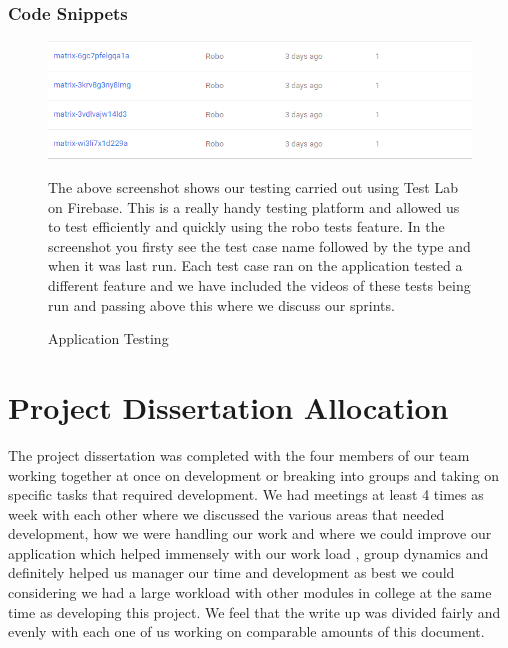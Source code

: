 \subsubsection{Code Snippets}
\begin{figure}[h]
    \includegraphics[width=1\textwidth]{img/testingCode.png}
    \caption{Application Testing}
    \label{fig}
    The above screenshot shows our testing carried out using Test Lab on Firebase. This is a really handy testing platform and allowed us to test efficiently and quickly using the robo tests feature. In the screenshot you firsty see the test case name followed by the type and when it was last run. Each test case ran on the application tested a different feature and we have included the videos of these tests being run and passing above this where we discuss our sprints.
\end{figure}
\section{Project Dissertation Allocation}
The project dissertation was completed with the four members of our team working together at once on development or breaking into groups and taking on specific tasks that required development. We had meetings at least 4 times as week with each other where we discussed the various areas that needed development, how we were handling our work and where we could improve our application which helped immensely with our work load , group dynamics and definitely helped us manager our time and development as best we could considering we had a large workload with other modules in college at the same time as developing this project.
We feel that the write up was divided fairly and evenly with each one of us working on
comparable amounts of this document.


